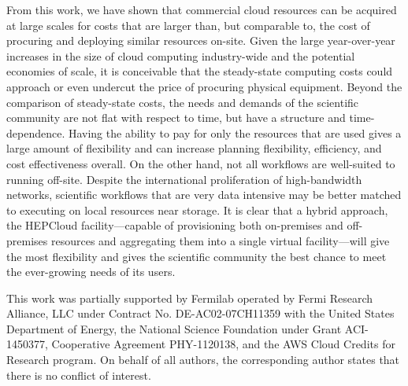 \documentclass[twocolumn]{svjour3}          %
\begin{document}
From this work, we have shown that commercial cloud resources can be acquired at large scales for costs that are larger than, but comparable to, the cost of
procuring and deploying similar resources on-site. Given the large year-over-year increases in the size of cloud computing industry-wide and the potential
economies of scale, it is conceivable that the steady-state computing costs could approach or even undercut the price of procuring physical equipment. Beyond the comparison of steady-state costs, the needs and demands of the scientific community are not flat with respect to time, but have a structure and time-dependence.
Having the ability to pay for only the resources that are used gives a large amount of flexibility and can increase planning flexibility, efficiency,  and cost
effectiveness overall.
On the other hand, not all workflows are well-suited to running off-site. Despite the international proliferation of high-bandwidth networks, scientific workflows that are very data intensive may be better matched to executing on local resources near storage.  It is clear that a hybrid approach, the HEPCloud facility---capable of provisioning both on-premises and off-premises resources and aggregating them into a single virtual facility---will give the most flexibility and gives the
scientific community the best chance to meet the ever-growing needs of its users.

\begin{acknowledgements}
This work was partially supported by Fermilab operated by
Fermi Research Alliance, LLC under Contract No.  DE-AC02-07CH11359 with the United States
Department  of  Energy,  the  National  Science  Foundation  under  Grant  ACI-1450377,
Cooperative Agreement PHY-1120138, and the AWS Cloud Credits for Research program.
On behalf of all authors, the corresponding author states that there is no conflict of interest.
\end{acknowledgements}
\end{document}
